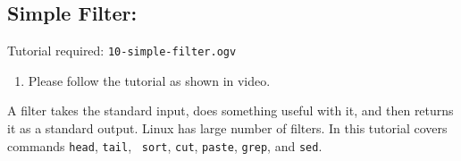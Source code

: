 \documentclass[11pt]{article}
\newenvironment{enumcpt}{\begin{enumerate} \topsep 0pt \partopsep 0pt 
                        \parsep 0pt
                        \itemsep 0pt \leftmargin -1in \rightmargin 0pt
                        }{\end{enumerate}}
\begin{document}
\begin{multicols}{2}
\section{Simple Filter:}
Tutorial required: {\tt 10-simple-filter.ogv} 

\begin{enumcpt}
\item Please follow the tutorial as shown in video.
\end{enumcpt}

A filter takes the standard input, does something useful with it, and
then returns it as a standard output. Linux has large number of
filters. In this tutorial covers commands {\tt head}, {\tt tail}, {\tt
  sort}, {\tt cut}, {\tt paste}, {\tt grep}, and {\tt sed}.


\end{multicols}
\end{document}
